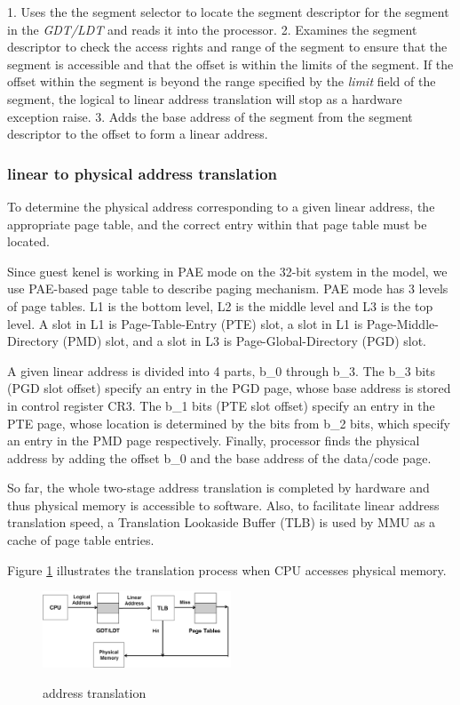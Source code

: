 1. Uses the the segment selector to locate the segment descriptor for the segment in the \emph{GDT/LDT} and reads it into the processor.
2. Examines the segment descriptor to check the access rights and range of the segment to ensure that the segment is accessible and that the offset is within the limits of the segment. If the offset within the segment is beyond the range specified by the \emph{limit} field of the segment, the logical to linear address translation will stop as a hardware exception raise.
3. Adds the base address of the segment from the segment descriptor to the offset to form a linear address.

\subsubsection{linear to physical address translation}
To determine the physical address corresponding to a given linear address, the appropriate page table, and the correct entry within that page table must be located.

Since guest kenel is working in PAE mode on the 32-bit system in the model, we use PAE-based page table to describe paging mechanism. PAE mode has 3 levels of page tables. L1 is the bottom level, L2 is the middle level and L3 is the top level. A slot in L1 is Page-Table-Entry (PTE) slot, a slot in L1 is Page-Middle-Directory (PMD) slot, and a slot in L3 is Page-Global-Directory (PGD) slot.

A given linear address is divided into 4 parts, b\_0 through b\_3. The b\_3 bits (PGD slot offset) specify an entry in the PGD page, whose base address is stored in control register CR3. The b\_1 bits (PTE slot offset) specify an entry in the PTE page, whose location is determined by the bits from b\_2 bits, which specify an entry in the PMD page respectively. Finally, processor finds the physical address by adding the offset b\_0 and the base address of the data/code page.

So far, the whole two-stage address translation is completed by hardware and thus physical memory is accessible to software. Also, to facilitate linear address translation speed, a Translation Lookaside Buffer (TLB) is used by MMU as a cache of page table entries.

Figure \ref{fig:address-translation} illustrates the translation process when CPU accesses physical memory.

\begin{figure}[ht]
\centering
\includegraphics[width=0.5\textwidth]{image/background/address-translation.png} \\
\caption{address translation}
\label{fig:address-translation}
\end{figure}

